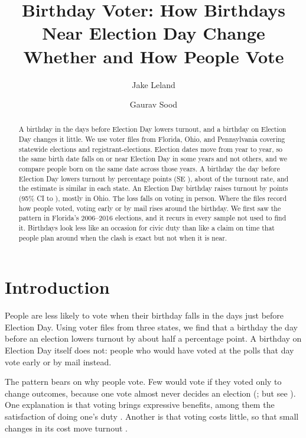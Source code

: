 \documentclass[11pt]{article}
\title{Birthday Voter: How Birthdays Near Election Day Change Whether and How People Vote}
\author{Jake Leland \and Gaurav Sood}
\date{}
\begin{document}
\maketitle

\begin{abstract}
\noindent A birthday in the days before Election Day lowers turnout, and a birthday on Election Day changes it little. We use voter files from Florida, Ohio, and Pennsylvania covering \nElections{} statewide elections and \nPersonElections{} registrant-elections. Election dates move from year to year, so the same birth date falls on or near Election Day in some years and not others, and we compare people born on the same date across those years. A birthday the day before Election Day lowers turnout by \dayPooled{} percentage points (SE \dayPooledSe{}), about \dayPooledRelative{} of the turnout rate, and the estimate is similar in each state. An Election Day birthday raises turnout by \birthdayPooled{} points (95\% CI \birthdayPooledLo{} to \birthdayPooledHi{}), mostly in Ohio. The loss falls on voting in person. Where the files record how people voted, voting early or by mail rises around the birthday. We first saw the pattern in Florida's 2006--2016 elections, and it recurs in every sample not used to find it. Birthdays look less like an occasion for civic duty than like a claim on time that people plan around when the clash is exact but not when it is near.
\end{abstract}

\section{Introduction}

People are less likely to vote when their birthday falls in the days just before Election Day. Using voter files from three states, we find that a birthday the day before an election lowers turnout by about half a percentage point. A birthday on Election Day itself does not: people who would have voted at the polls that day vote early or by mail instead.

The pattern bears on why people vote. Few would vote if they voted only to change outcomes, because one vote almost never decides an election (\citealp{downs1957economic, mclean1994condorcet}; but see \citealp{edlin2007voting}). One explanation is that voting brings expressive benefits, among them the satisfaction of doing one's duty \citep{riker1968theory, fiorina1976voting, kan2001expressive}. Another is that voting costs little, so that small changes in its cost move turnout \citep{verba1993citizen}.
\end{document}
